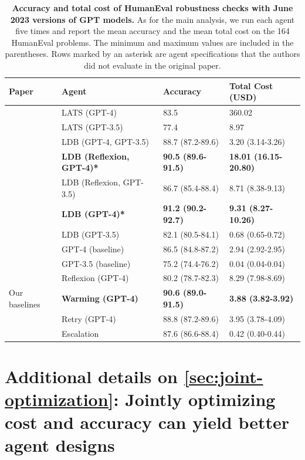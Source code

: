 \documentclass{article}
\begin{document}
\begin{table}[h]\small
        \centering
        {
        \begin{tabular}{l|l|l|l}
        \toprule
    \textbf{Paper} & \textbf{Agent} & \textbf{Accuracy} & \textbf{Total Cost (USD)} \\
    \midrule
   \citet{zhou_language_2023}
    & LATS (GPT-4) & 83.5 & 360.02\\
    & LATS (GPT-3.5) & 77.4 & 8.97\\
    \midrule
   \citet{zhong_ldb_2024}
    & LDB (GPT-4, GPT-3.5) & 88.7 (87.2-89.6)& 3.20 (3.14-3.26)\\
    & \textbf{LDB (Reflexion, GPT-4)*} & \textbf{90.5 (89.6-91.5)}& \textbf{18.01 (16.15-20.80)}\\
    & LDB (Reflexion, GPT-3.5) & 86.7 (85.4-88.4)& 8.71 (8.38-9.13)\\
    & \textbf{LDB (GPT-4)*} & \textbf{91.2 (90.2-92.7)}& \textbf{9.31 (8.27-10.26)}\\
    & LDB (GPT-3.5) & 82.1 (80.5-84.1)& 0.68 (0.65-0.72)\\
    & GPT-4 (baseline) & 86.5 (84.8-87.2)&2.94 (2.92-2.95)\\
    & GPT-3.5 (baseline) & 75.2 (74.4-76.2)& 0.04 (0.04-0.04)\\
    \midrule
   \citet{shinn_reflexion_2023}
    & Reflexion (GPT-4) & 80.2 (78.7-82.3)& 8.29 (7.98-8.69)\\
    \midrule
   Our baselines & \textbf{Warming (GPT-4)} & \textbf{90.6 (89.0-91.5)}&\textbf{3.88 (3.82-3.92)} \\
        & Retry (GPT-4) & 88.8 (87.2-89.6)& 3.95 (3.78-4.09) \\
        & Escalation & 87.6 (86.6-88.4)&0.42 (0.40-0.44)\\
    \bottomrule 
    \end{tabular}
    }
\caption{\textbf{Accuracy and total cost of HumanEval robustness checks with June 2023 versions of GPT models.} As for the main analysis, we run each agent five times and report the mean accuracy and the mean total cost on the 164 HumanEval problems. The minimum and maximum values are included in the parentheses. Rows marked by an asterisk are agent specifications that the authors did not evaluate in the original paper.}
\label{tab:humaneval-results-robustness}
\end{table}


\section{Additional details on \cref{sec:joint-optimization}: Jointly optimizing cost and accuracy can yield better agent designs}
\label{appendix:jointoptim}
\end{document}
